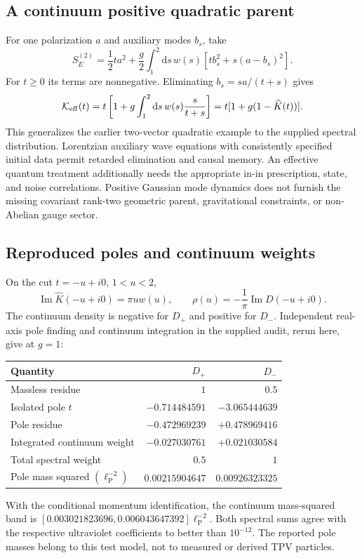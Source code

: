 \documentclass[11pt,oneside]{report}
\newcommand{\dd}{\mathrm d}
\newcommand{\lp}{\ell_{\mathrm P}}
\begin{document}
\subsection{A continuum positive quadratic parent}
For one polarization $a$ and auxiliary modes $b_s$, take
\begin{equation}
S_E^{(2)}=\frac12ta^2+
\frac g2\int_1^2\dd s\,w(s)\left[tb_s^2+s(a-b_s)^2\right].
\end{equation}
For $t\ge0$ its terms are nonnegative. Eliminating $b_s=s a/(t+s)$ gives
\begin{equation}
\mathcal K_{\rm eff}(t)=t\left[1+g\int_1^2\dd s\,w(s)\frac{s}{t+s}\right]
=t[1+g(1-\widehat K(t))].
\end{equation}
This generalizes the earlier two-vector quadratic example to the supplied spectral distribution. Lorentzian auxiliary wave equations with consistently specified initial data permit retarded elimination and causal memory. An effective quantum treatment additionally needs the appropriate in-in prescription, state, and noise correlations. Positive Gaussian mode dynamics does not furnish the missing covariant rank-two geometric parent, gravitational constraints, or non-Abelian gauge sector.

\subsection{Reproduced poles and continuum weights}
On the cut $t=-u+i0$, $1<u<2$,
\begin{equation}
\operatorname{Im}\widehat K(-u+i0)=\pi u w(u),\qquad
\rho(u)=-\frac1\pi\operatorname{Im}D(-u+i0).
\end{equation}
The continuum density is negative for $D_+$ and positive for $D_-$. Independent real-axis pole finding and continuum integration in the supplied audit, rerun here, give at $g=1$:
\begin{center}\begin{tabular}{lrr}\toprule
Quantity & $D_+$ & $D_-$\\\midrule
Massless residue & $1$ & $0.5$\\
Isolated pole $t$ & $-0.714484591$ & $-3.065444639$\\
Pole residue & $-0.472969239$ & $+0.478969416$\\
Integrated continuum weight & $-0.027030761$ & $+0.021030584$\\
Total spectral weight & $0.5$ & $1$\\
Pole mass squared $(\lp^{-2})$ & $0.00215904647$ & $0.00926323325$\\\bottomrule
\end{tabular}\end{center}
With the conditional momentum identification, the continuum mass-squared band is $[0.003021823696,0.006043647392]\lp^{-2}$. Both spectral sums agree with the respective ultraviolet coefficients to better than $10^{-12}$. The reported pole masses belong to this test model, not to measured or derived TPV particles.
\end{document}
